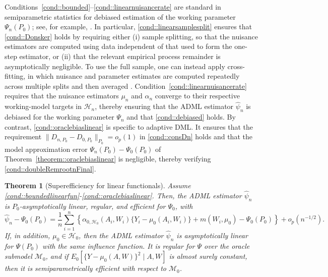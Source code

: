 \documentclass[11pt]{article}
\newtheorem{theorem}{Theorem}
\theoremstyle{definition}
\begin{document}
Conditions~\ref{cond::bounded}--\ref{cond::linearnuisancerate} are standard in semiparametric statistics for debiased estimation of the working parameter \(\Psi_n(P_0)\); see, for example, \cite{bickel1993efficient, robins1995analysis, vanderlaanunified, vanderLaanRose2011, DoubleML, chernozhukov2022automatic}. In particular, \ref{cond::linearsamplesplit} ensures that \ref{cond::Donsker} holds by requiring either (i) sample splitting, so that the nuisance estimators are computed using data independent of that used to form the one-step estimator, or (ii) that the relevant empirical process remainder is asymptotically negligible. To use the full sample, one can instead apply cross-fitting, in which nuisance and parameter estimates are computed repeatedly across multiple splits and then averaged \citep{van2011cross, DoubleML}. Condition~\ref{cond::linearnuisancerate} requires that the nuisance estimators \(\mu_n\) and \(\alpha_n\) converge to their respective working-model targets in \(\mathcal{H}_n\), thereby ensuring that the ADML estimator \(\widehat{\psi}_n\) is debiased for the working parameter \(\Psi_n\) and that \ref{cond::debiased} holds. By contrast, \ref{cond::oraclebiaslinear} is specific to adaptive DML. It ensures that the requirement $\|D_{n,P_0} - D_{0,P_0}\|_{P_0} = o_p(1)$ in \ref{cond::consDn} holds and that the model approximation error $\Psi_n(P_0) - \Psi_0(P_0)$ of Theorem~\ref{theorem::oraclebiaslinear} is negligible, thereby verifying \ref{cond::doubleRemrootnFinal}. 



  

\begin{theorem}[Superefficiency for linear functionals]
\label{theorem::ALlinear}
 Assume \ref{cond::boundedlinearfun}-\ref{cond::oraclebiaslinear}.  Then, the ADML estimator $\widehat{\psi}_n$ is $P_0$-asymptotically linear, regular, and efficient for $\Psi_0$, with
\begin{equation*}
\widehat{\psi}_n - \Psi_0(P_0) = \frac{1}{n}\sum_{i=1}^n \left\{ \alpha_{0, \mathcal{H}_0}(A_i, W_i) \{Y_i - \mu_0(A_i, W_i)\} + m(W_i, \mu_0) - \Psi_0(P_0) \right\} + o_p(n^{-1/2}).
\end{equation*}
If, in addition, \(\mu_0 \in \mathcal{H}_0\), then the ADML estimator \(\widehat{\psi}_n\) is asymptotically linear for \(\Psi(P_0)\) with the same influence function. It is regular for $\Psi$ over the oracle submodel \(\mathcal{M}_0\), and if $E_0[\{Y - \mu_0(A,W)\}^2 \mid A, W]$ is almost surely constant, then it is semiparametrically efficient with respect to \(\mathcal{M}_0\).
\end{theorem}
 
\end{document}
